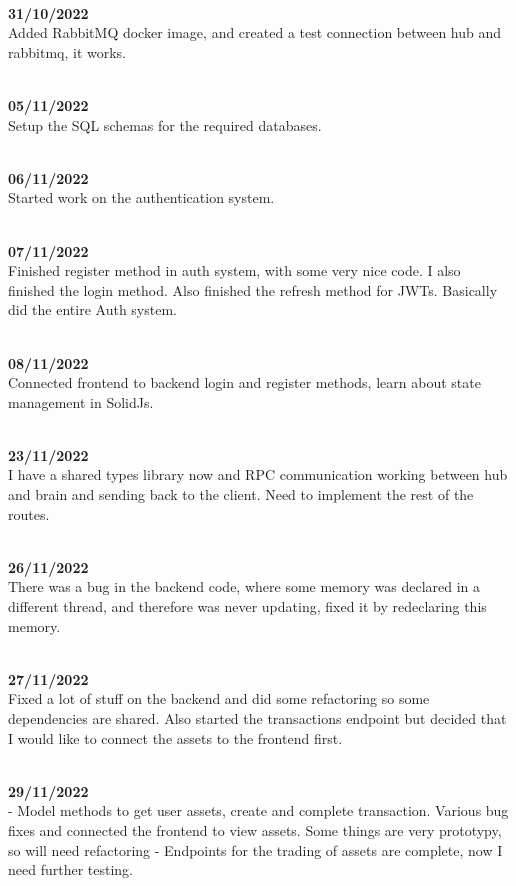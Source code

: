 \documentclass[titlepage]{article}
\begin{document}
\\
\noindent
\textbf{31/10/2022} \\
Added RabbitMQ docker image, and created a test connection between hub and rabbitmq, it works.

\\
\noindent
\textbf{05/11/2022} \\
Setup the SQL schemas for the required databases.

\\
\noindent
\textbf{06/11/2022} \\
Started work on the authentication system.

\\
\noindent
\textbf{07/11/2022} \\
Finished register method in auth system, with some very nice code.
I also finished the login method.
Also finished the refresh method for JWTs. Basically did the entire Auth system.

\\
\noindent
\textbf{08/11/2022} \\
Connected frontend to backend login and register methods, learn about state management in SolidJs.

\\
\noindent
\textbf{23/11/2022} \\
I have a shared types library now and RPC communication working between hub and brain and sending back to the client. Need to implement the rest of the routes.

\\
\noindent
\textbf{26/11/2022} \\
There was a bug in the backend code, where some memory was declared in a different thread, and therefore was never updating, fixed it by redeclaring this memory.

\\
\noindent
\textbf{27/11/2022} \\
Fixed a lot of stuff on the backend and did some refactoring so some dependencies are shared. Also started the transactions endpoint but decided that I would like to connect the assets to the frontend first.

\\
\noindent
\textbf{29/11/2022} \\
 - Model methods to get user assets, create and complete transaction. Various bug fixes and connected the frontend to view assets. Some things are very prototypy, so will need refactoring
 - Endpoints for the trading of assets are complete, now I need further testing.
\end{document}
